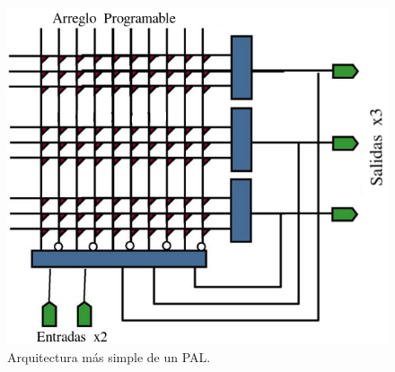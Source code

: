 \documentclass[twoside,spanish,ESP,MSc]{plantillaLabUPV}
\theoremstyle{definition}
\newcommand{\f}{FPGA }
\newcommand{\fs}{FPGAs }
\begin{document}
\begin{figure}[h]
\centering
\includegraphics[scale=0.45]{ima/pal.png}
\caption{Arquitectura más simple de un PAL.}%
\label{pal}
\end{figure}



%
%
%
%
%
%
\end{document}
